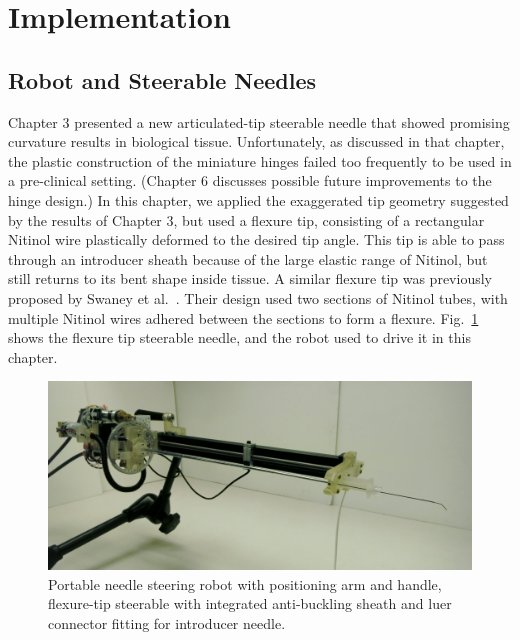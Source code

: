 \section{Implementation}
\label{sec:HumanInTheLoopImplementation}

\subsection{Robot and Steerable Needles}
\label{sec:NS2RobotAndNeedle}
Chapter 3 presented a new articulated-tip steerable needle that showed promising curvature results in biological tissue. Unfortunately, as discussed in that chapter, the plastic construction of the miniature hinges failed too frequently to be used in a pre-clinical setting. (Chapter 6 discusses possible future improvements to the hinge design.) In this chapter, we applied the exaggerated tip geometry suggested by the results of Chapter 3, but used a flexure tip, consisting of a rectangular Nitinol wire plastically deformed to the desired tip angle. This tip is able to pass through an introducer sheath because of the large elastic range of Nitinol, but still returns to its bent shape inside tissue. A similar flexure tip was previously proposed by Swaney et al.~\cite{Swaney2013}. Their design used two sections of Nitinol tubes, with multiple Nitinol wires adhered between the sections to form a flexure. Fig.~\ref{fig:NS2AndNeedle} shows the flexure tip steerable needle, and the robot used to drive it in this chapter.

\begin{figure}[!t]
\centering
\includegraphics[width = \columnwidth]{./Images/Chapter5/NS2RobotAndNeedle/NS2RobotAndNeedle.jpg}%
\caption[Robot and flexure-tip steerable needles]{Portable needle steering robot with positioning arm and handle, flexure-tip steerable with integrated anti-buckling sheath and luer connector fitting for introducer needle.}
\label{fig:NS2AndNeedle}
\end{figure} 

